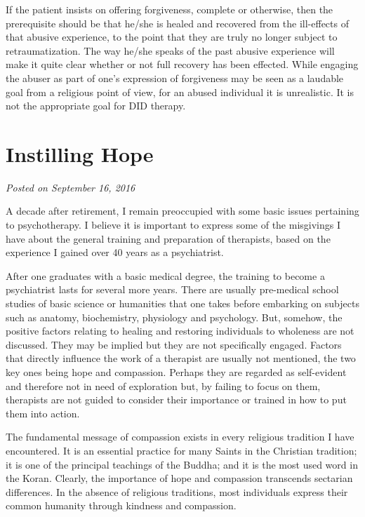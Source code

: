 \documentclass[]{book}
\begin{document}
If the patient insists on offering forgiveness, complete or otherwise, then the prerequisite should be that he/she is healed and recovered from the ill-effects of that abusive experience, to the point that they are truly no longer subject to retraumatization. The way he/she speaks of the past abusive experience will make it quite clear whether or not full recovery has been effected. While engaging the abuser as part of one's expression of forgiveness may be seen as a laudable goal from a religious point of view, for an abused individual it is unrealistic. It is not the appropriate goal for DID therapy.

\hypertarget{instilling-hope}{%
\section{Instilling Hope}\label{instilling-hope}}

\emph{Posted on September 16, 2016}

A decade after retirement, I remain preoccupied with some basic issues pertaining to psychotherapy. I believe it is important to express some of the misgivings I have about the general training and preparation of therapists, based on the experience I gained over 40 years as a psychiatrist.

After one graduates with a basic medical degree, the training to become a psychiatrist lasts for several more years. There are usually pre-medical school studies of basic science or humanities that one takes before embarking on subjects such as anatomy, biochemistry, physiology and psychology. But, somehow, the positive factors relating to healing and restoring individuals to wholeness are not discussed. They may be implied but they are not specifically engaged. Factors that directly influence the work of a therapist are usually not mentioned, the two key ones being hope and compassion. Perhaps they are regarded as self-evident and therefore not in need of exploration but, by failing to focus on them, therapists are not guided to consider their importance or trained in how to put them into action.

The fundamental message of compassion exists in every religious tradition I have encountered. It is an essential practice for many Saints in the Christian tradition; it is one of the principal teachings of the Buddha; and it is the most used word in the Koran. Clearly, the importance of hope and compassion transcends sectarian differences. In the absence of religious traditions, most individuals express their common humanity through kindness and compassion.
\end{document}
